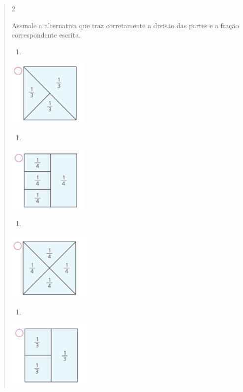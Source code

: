 \begin{mdframed}[linewidth=2pt,linecolor=salmao,roundcorner=2pt]
\begin{itemize}
{\begin{itemize}
\begin{escolha}
{\begin{quote}
{\begin{escolha}
{{{{\num{2}

Assinale a alternativa que traz corretamente a divisão das partes e a
fração correspondente escrita.

\begin{enumerate}
\item
\end{enumerate}

\includegraphics[width=1.55847in,height=1.26678in]{media/image123.png}

\begin{enumerate}
\item
\end{enumerate}

\includegraphics[width=1.55847in,height=1.27511in]{media/image124.png}

\begin{enumerate}
\item
\end{enumerate}

\includegraphics[width=1.56680in,height=1.31678in]{media/image125.png}

\begin{enumerate}
\item
\end{enumerate}

\includegraphics[width=1.58347in,height=1.30845in]{media/image126.png}

}}}}
\end{escolha}}
\end{quote}}
\end{escolha}
\end{itemize}}
\end{itemize}
\end{mdframed}
